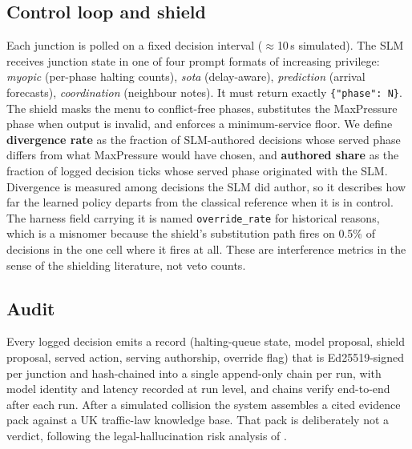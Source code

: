 \documentclass[conference]{IEEEtran}
\begin{document}
\subsection{Control loop and shield}
Each junction is polled on a fixed decision interval ($\approx$10\,s
simulated). The SLM receives junction state in one of four prompt formats of
increasing privilege: \emph{myopic} (per-phase halting counts),
\emph{sota} (delay-aware), \emph{prediction} (arrival forecasts),
\emph{coordination} (neighbour notes). It must return exactly
\texttt{\{"phase": N\}}. The shield masks the menu to conflict-free phases,
substitutes the MaxPressure phase when output is invalid, and enforces a
minimum-service floor. We define \textbf{divergence rate} as the fraction of
SLM-authored decisions whose served phase differs from what MaxPressure would
have chosen, and \textbf{authored share} as the fraction of logged decision
ticks whose served phase originated with the SLM. Divergence is measured among
decisions the SLM did author, so it describes how far the learned policy
departs from the classical reference when it is in control. The harness field
carrying it is named \texttt{override\_rate} for historical reasons, which is
a misnomer because the shield's substitution path fires on 0.5\% of
decisions in the one cell where it fires at all. These are interference metrics in the sense of the shielding
literature, not veto counts.

\subsection{Audit}
Every logged decision emits a record (halting-queue state, model proposal,
shield proposal, served action, serving authorship, override flag) that is
Ed25519-signed per junction and hash-chained into a single append-only chain
per run, with model identity and latency recorded at run level, and chains
verify end-to-end after each run. After a
simulated collision the system assembles a cited evidence pack against a UK
traffic-law knowledge base. That pack is deliberately not a verdict,
following the legal-hallucination risk analysis of \cite{dahl2024legal}.
\end{document}
